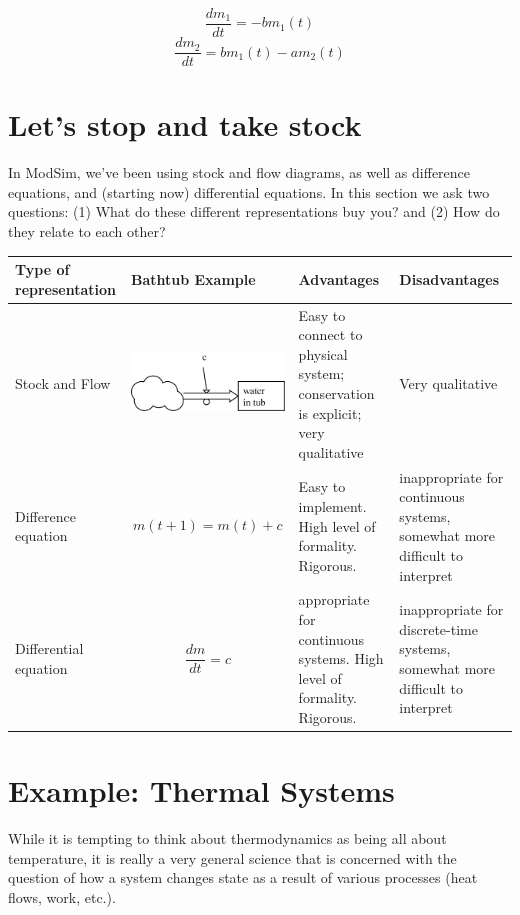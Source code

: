 $$\frac{dm_1}{dt} = -bm_1(t)$$
$$\frac{dm_2}{dt} = bm_1(t)-am_2(t)$$

 
 \section{Let's stop and take stock} 
 
In ModSim, we've been using stock and flow diagrams, as well as difference equations, and (starting now) differential equations.  In this section we ask two questions: (1) What do these different representations buy you? and (2) How do they relate to each other?

\begin{center}
\begin{tabular}{ | p{2cm} | p{5.5cm} | p{2.5cm}   | p{2.5cm}  |}
\hline
Type of representation & Bathtub Example & Advantages & Disadvantages \\
\hline
Stock and Flow & \vspace{0.05in} \includegraphics[height=.7in]{figs/stockandflowbathtub}\vspace{0.05in} & Easy to connect to physical system; conservation is explicit; very qualitative & Very qualitative \\
\hline
Difference equation & $$m(t+1) = m(t) + c$$ & Easy to implement. High level of formality.  Rigorous. & inappropriate for continuous systems, somewhat more difficult to interpret \\
\hline
Differential equation & $$\frac{dm}{dt} = c$$ & appropriate for continuous systems. High level of formality.  Rigorous. & inappropriate for discrete-time systems, somewhat more difficult to interpret \\
\hline
\end{tabular}
\end{center}



 \section{Example: Thermal Systems}

While it is tempting to think about thermodynamics as being all about temperature, it is really a very general science that is concerned with the question of how a system changes state as a result of various processes (heat flows, work, etc.).  

